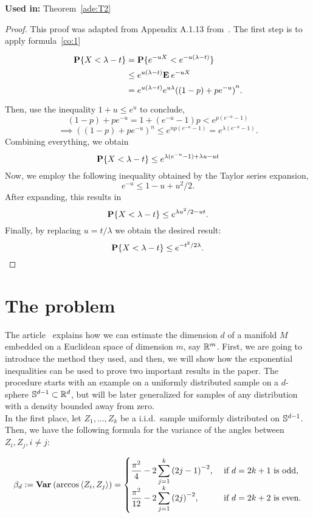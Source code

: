 \textbf{Used in:} Theorem~\ref{ade:T2}

\begin{proof}
This proof was adapted from Appendix A.1.13 from~\cite{alon2016probabilistic}. The first step is to apply formula~\ref{co:1}
  \[ 
    \everymath{\displaystyle}\arraycolsep=1.4pt\def\arraystretch{1.5}
    \begin{array}{rcl}
      \P \{X < \lambda - t\} & = & \P \{e^{-uX} < e^{-u(\lambda - t)}\}\\
      & \leq & e^{u(\lambda-t)} \E e^{-uX}\\
      & = & e^{u(\lambda-t)} e^{u\lambda} {((1-p) + p e^{-u})}^n.
    \end{array} 
   \]
   Then, use the inequality $1+u\leq e^{u}$ to conclude,
   \[ (1-p)+pe^{-u} = 1+(e^{-u}-1)p < e^{p(e^{-u}-1)} \]
   \[ \implies {((1-p)+pe^{-u})}^n \leq e^{np(e^{-u}-1)} = e^{\lambda(e^{-u}-1)}. \] 
   Combining everything, we obtain
   \[ \P \{X < \lambda - t\} \leq e^{\lambda(e^{-u}-1)+\lambda u - ut} \]
   Now, we employ the following inequality obtained by the Taylor series expansion,
   \[ e^{-u} \leq 1-u+u^2/2.\]
   After expanding, this results in 
   \[ \P \{X < \lambda - t\} \leq e^{\lambda u^2 / 2 - ut}. \]
   Finally, by replacing $u = t/\lambda$ we obtain the desired result:
   \[ \P \{X < \lambda - t\} \leq e^{-t^2/2\lambda}. \] 
\end{proof}

\section{The problem}

The article~\cite{diaz2019local} explains how we can estimate the dimension $d$ of a manifold $M$ embedded on a Euclidean space of dimension $m$, say $\R^m$. First, we are going to introduce the method they used, and then, we will show how the exponential inequalities can be used to prove two important results in the paper. The procedure starts with an example on a uniformly distributed sample on a $d$-sphere $\S^{d-1} \subset \R^d$, but will be later generalized for samples of any distribution with a density bounded away from zero.\\[1em]

In the first place, let $Z_1, \ldots, Z_k$ be a i.i.d.\ sample uniformly distributed on $\S^{d-1}$. Then, we have the following formula for the variance of the angles between $Z_i,Z_j, i\neq j$:

\begin{equation}\label{ade:1}\everymath{\displaystyle}
  \beta_d := \Var(\arccos \angles{Z_i,Z_j}) = \begin{cases}
    \frac{\pi^2}{4} - 2 \sum_{j = 1}^{k} {(2j-1)}^{-2}, & \mbox{ if } d = 2k+1 \mbox{ is odd},\\
    \frac{\pi^2}{12}- 2 \sum_{j = 1}^{k} {(2j)}^{-2}, & \mbox{ if } d = 2k+2 \mbox{ is even.}
  \end{cases}
\end{equation}

